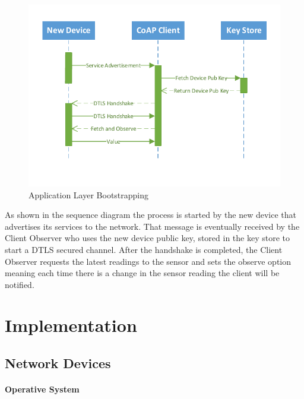 \begin{figure}[h]
  \centering
  \includegraphics[width=0.8\linewidth]{figures/Sequence_Application_Admission.pdf}
  \caption{Application Layer Bootstrapping}
  \label{fig:sequence_application_admission}
\end{figure}

As shown in the sequence diagram the process is started by the new device that advertises its services to the network. That message is eventually received by the Client Observer who uses the new device public key, stored in the key store to start a \gls{DTLS} secured channel. After the handshake is completed, the Client Observer requests the latest readings to the sensor and sets the observe option meaning each time there is a change in the sensor reading the client will be notified.

\section{Implementation}

\subsection{Network Devices}

\paragraph{\textbf{Operative System}}
